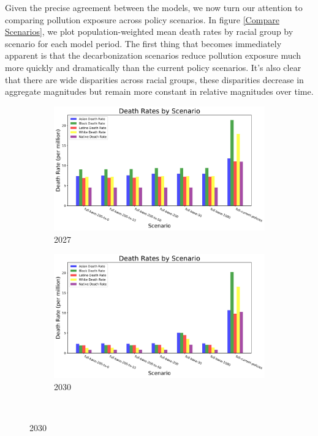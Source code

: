 \documentclass[a4paper]{article}
\theoremstyle{definition}
\theoremstyle{plain}
\begin{document}
Given the precise agreement between the models, we now turn our attention to comparing pollution exposure across policy scenarios.  In figure \ref{Compare Scenarios}, we plot population-weighted mean death rates by racial group by scenario for each model period.  The first thing that becomes immediately apparent is that the decarbonization scenarios reduce pollution exposure much more quickly and dramatically than the current policy scenarios.  It's also clear that there are wide disparities across racial groups, these disparities decrease in aggregate magnitudes but remain more constant in relative magnitudes over time.
\begin{figure}
    \centering
    \begin{subfigure}[b]{0.49\textwidth}
        \includegraphics[width=\textwidth]{Figures/Output/Compare_scenarios_all-scenarios_2027_GenX.jpg}
        \caption{2027}
        \label{Subfig1}
    \end{subfigure}
    \hfill
    \begin{subfigure}[b]{0.49\textwidth}
        \includegraphics[width=\textwidth]{Figures/Output/Compare_scenarios_all-scenarios_2030_GenX.jpg}
        \caption{2030}
        \label{Subfig2}
    \end{subfigure}\\


\end{figure}
\end{document}

